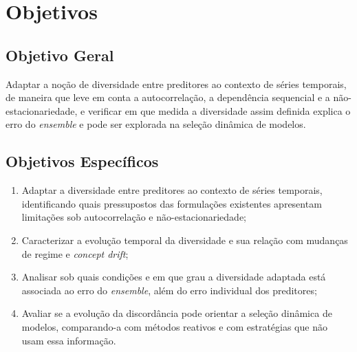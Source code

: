 \section{Objetivos}

\subsection{Objetivo Geral}
Adaptar a noção de diversidade entre preditores ao contexto de séries temporais, de
maneira que leve em conta a autocorrelação, a dependência sequencial e a
não-estacionariedade, e verificar em que medida a diversidade assim definida explica o
erro do \textit{ensemble} e pode ser explorada na seleção dinâmica de modelos.

\subsection{Objetivos Específicos}
\begin{enumerate}
    \item Adaptar a diversidade entre preditores ao contexto de séries temporais,
    identificando quais pressupostos das formulações existentes apresentam limitações
    sob autocorrelação e não-estacionariedade;
    \item Caracterizar a evolução temporal da diversidade e sua relação com mudanças de
    regime e \textit{concept drift};
    \item Analisar sob quais condições e em que grau a diversidade adaptada está
    associada ao erro do \textit{ensemble}, além do erro individual dos preditores;
    \item Avaliar se a evolução da discordância pode orientar a seleção dinâmica de
    modelos, comparando-a com métodos reativos e com estratégias que não usam essa
    informação.
\end{enumerate}